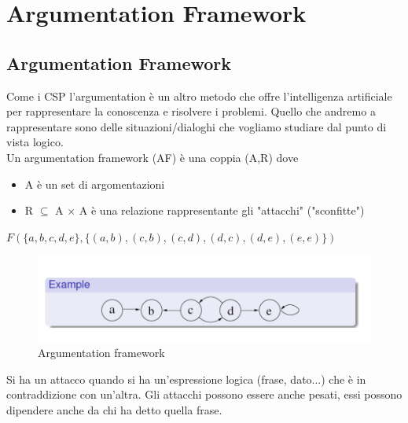 \chapter{Argumentation Framework} \label{ch:Argumentation Framework}
\section{Argumentation Framework}
Come i CSP l'argumentation è un altro metodo che offre l'intelligenza
artificiale per rappresentare la conoscenza e risolvere i problemi. Quello che
andremo a rappresentare sono delle situazioni/dialoghi che vogliamo studiare dal
punto di vista logico.\\
Un argumentation framework (AF) è una coppia (A,R) dove
\begin{itemize}
    \item A è un set di argomentazioni
    \item R $\subseteq$ A $\times$ A è una relazione rappresentante gli "attacchi"
          ("sconfitte")
\end{itemize}
\begin{center}
    $F(\{a,b,c,d,e\}, \{(a,b),(c,b),(c,d),(d,c),(d,e),(e,e)\})$
\end{center}
\begin{figure}[H]
    \centering
    \includegraphics[width=12cm, keepaspectratio]{img/Cap6/arg1.png}
    \caption{Argumentation framework}
\end{figure}

Si ha un attacco quando si ha un'espressione logica (frase, dato...) che è in
contraddizione con un'altra. Gli attacchi possono essere anche pesati, essi
possono dipendere anche da chi ha detto quella frase.

